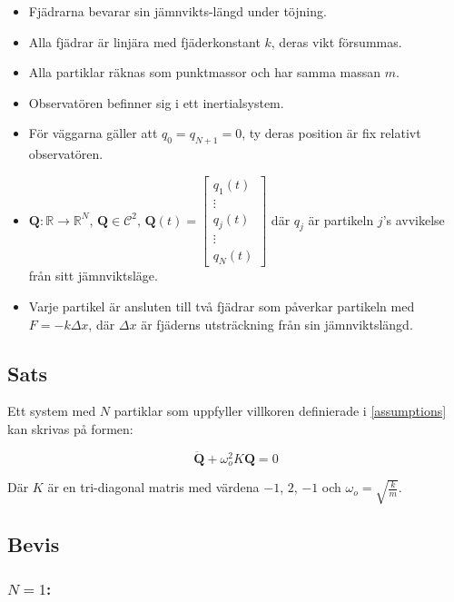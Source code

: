 \documentclass[12pt,a4paper]{article}
\newcommand{\R}{\ensuremath{\mathbb{R}}}
\begin{document}
\begin{appendix}
		\begin{itemize}
			\item Fjädrarna bevarar sin jämnvikts-längd under töjning.
			\item Alla fjädrar är linjära med fjäderkonstant $k$, deras vikt försummas.
			\item Alla partiklar räknas som punktmassor och har samma massan $m$.
			\item Observatören befinner sig i ett inertialsystem.
			\item För väggarna gäller att $q_0 = q_{N+1} = 0$, ty deras position är fix relativt observatören.
			\item $\mathbf{Q}: \R \rightarrow \R^N,\, \mathbf{Q} \in \mathcal{C}^2,\,\mathbf{Q}(t) = \begin{bmatrix}q_1(t) \\ \vdots \\ q_j(t) \\ \vdots \\ q_N(t) \end{bmatrix}$ där $q_j$ är
			      partikeln $j$'s avvikelse från sitt jämnviktsläge.
			\item Varje partikel är ansluten till två fjädrar som påverkar partikeln
			      med $F = -k \Delta x$, där $\Delta x$ är fjäderns utsträckning från sin jämnviktslängd.
		\end{itemize}
	
	
	\subsection{Sats}
		\label{sats}
		
		Ett system med $N$ partiklar som uppfyller villkoren definierade i \ref{assumptions} kan skrivas
		på formen:
		
		\begin{equation*}
			\mathbf{\ddot{Q}} + \omega_{o}^{2} K \mathbf{Q} = 0
		\end{equation*}
		
		Där $K$ är en tri-diagonal matris med värdena $-1$, $2$, $-1$ och $\omega_o = \sqrt{\frac{k}{m}}$.
		
	\newpage
	
	\subsection{Bevis}
		
	\subsubsection*{$N=1$:}
		

\end{appendix}
\end{document}
